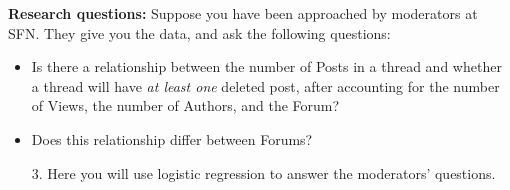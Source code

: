 \documentclass[11pt]{article}
\begin{document}
\noindent \textbf{Research questions:} Suppose you have been approached by moderators at SFN. They give you the data, and ask the following questions:
\begin{itemize}
\item Is there a relationship between the number of Posts in a thread and whether a thread will have \textit{at least one} deleted post, after accounting for the number of Views, the number of Authors, and the Forum?
\item Does this relationship differ between Forums?
\end{itemize}

\begin{enumerate}
\item[3.] Here you will use logistic regression to answer the moderators' questions.


\end{enumerate}
\end{document}
